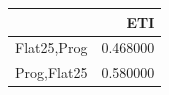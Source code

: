 \begin{tabular}{lr}
\toprule
 & ETI \\
\midrule
Flat25,Prog & 0.468000 \\
Prog,Flat25 & 0.580000 \\
\bottomrule
\end{tabular}
